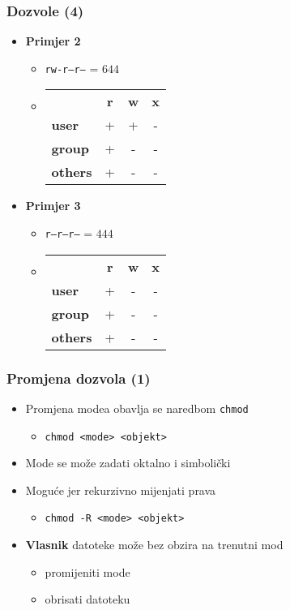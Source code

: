 \documentclass[table,usenames,dvipsnames] {beamer}
\newcommand{\shell}[1]{\texttt{#1}}
\begin{document}
\begin{frame}[t]
  \frametitle{Dozvole (4)}
\begin{itemize}
  \item \textbf{Primjer 2}
  \begin{itemize}
      \item[] \shell{rw-r--r--} = $644$
      \item[] \hspace{1em} \begin{tabular}{l c c c}
        & \textbf{r} & \textbf{w} & \textbf{x}\\
        \textbf{user} & + & + & -\\
        \textbf{group} & + & - & -\\
        \textbf{others} & + & - & -
      \end{tabular}
  \end{itemize}
\end{itemize}
\vfill
\begin{itemize}
  \item \textbf{Primjer 3}
  \begin{itemize}
      \item[] \shell{r--r--r--} = $444$
      \item[] \hspace{1em} \begin{tabular}{l c c c}
        & \textbf{r} & \textbf{w} & \textbf{x}\\
        \textbf{user} & + & - & -\\
        \textbf{group} & + & - & -\\
        \textbf{others} & + & - & -
      \end{tabular}
  \end{itemize}
\end{itemize}
\end{frame}

\begin{frame}[t]
\frametitle{Promjena dozvola (1)}
\begin{itemize}
  \item Promjena modea obavlja se naredbom \shell{chmod}
  \begin{itemize}
    \item[] \shell{chmod <mode> <objekt>}
  \end{itemize}
  \item Mode se može zadati oktalno i simbolički
  \item Moguće jer rekurzivno mijenjati prava
  \begin{itemize}
    \item[] \shell{chmod -R <mode> <objekt>}
  \end{itemize}
  \vfill
    \item \textbf{Vlasnik} datoteke može bez obzira na trenutni mod
    \begin{itemize}
      \item promijeniti mode
      \item obrisati datoteku
    \end{itemize}
\end{itemize}
\end{frame}
\end{document}
